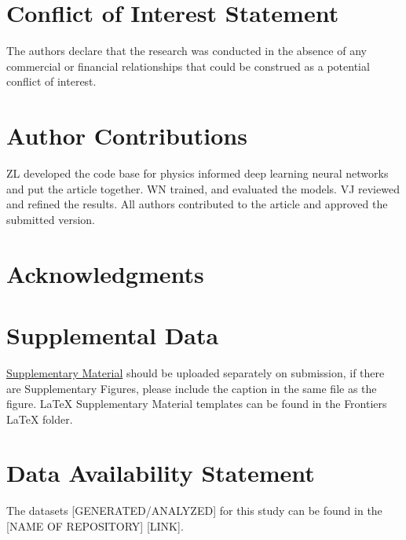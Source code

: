 \documentclass[AMA,STIX1COL]{WileyNJD-v2}
\begin{document}



\maketitle







\section*{Conflict of Interest Statement}
The authors declare that the research was conducted in the absence of any commercial or financial relationships that could be construed as a potential conflict of interest.

\section*{Author Contributions}
ZL developed the code base for physics informed deep learning neural networks and put the article together. WN trained, and evaluated the models. VJ reviewed and refined the results. All authors contributed to the article and approved the submitted version.


\section*{Acknowledgments}


\section*{Supplemental Data}
 \href{http://home.frontiersin.org/about/author-guidelines#SupplementaryMaterial}{Supplementary Material} should be uploaded separately on submission, if there are Supplementary Figures, please include the caption in the same file as the figure. LaTeX Supplementary Material templates can be found in the Frontiers LaTeX folder.

\section*{Data Availability Statement}
The datasets [GENERATED/ANALYZED] for this study can be found in the [NAME OF REPOSITORY] [LINK].


%

\end{document}
